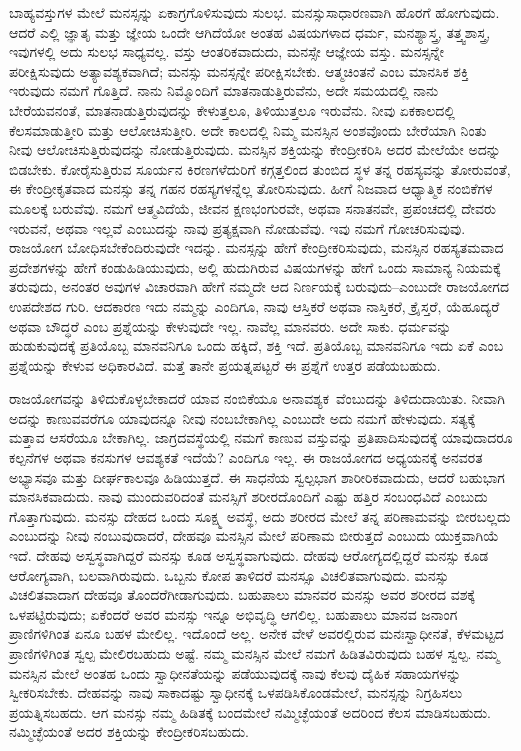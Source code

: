 \vskip 5pt

ಬಾಹ್ಯವಸ್ತುಗಳ ಮೇಲೆ ಮನಸ್ಸನ್ನು ಏಕಾಗ್ರಗೊಳಿಸುವುದು ಸುಲಭ. ಮನಸ್ಸು\break ಸಾಧಾರಣವಾಗಿ ಹೊರಗೆ ಹೋಗುವುದು. ಆದರೆ ಎಲ್ಲಿ ಜ್ಞಾತೃ ಮತ್ತು ಜ್ಞೇಯ ಒಂದೇ ಆಗಿದೆಯೋ ಅಂತಹ ವಿಷಯಗಳಾದ ಧರ್ಮ, ಮನಶ್ಯಾಸ್ತ್ರ, ತತ್ತ್ವಶಾಸ್ತ್ರ, ಇವುಗಳಲ್ಲಿ ಅದು ಸುಲಭ ಸಾಧ್ಯವಲ್ಲ. ವಸ್ತು ಆಂತರಿಕವಾದುದು, ಮನಸ್ಸೇ ಆಜ್ಞೇಯ ವಸ್ತು. ಮನಸ್ಸನ್ನೇ ಪರೀಕ್ಷಿಸುವುದು ಅತ್ಯಾವಶ್ಯಕವಾಗಿದೆ; ಮನಸ್ಸು ಮನಸ್ಸನ್ನೇ ಪರೀಕ್ಷಿಸಬೇಕು. ಆತ್ಮಚಿಂತನೆ ಎಂಬ ಮಾನಸಿಕ ಶಕ್ತಿ ಇರುವುದು ನಮಗೆ ಗೊತ್ತಿದೆ. ನಾನು ನಿಮ್ಮೊಂದಿಗೆ ಮಾತನಾಡುತ್ತಿರುವೆನು, ಅದೇ ಸಮಯದಲ್ಲಿ ನಾನು ಬೇರೆಯವನಂತೆ, ಮಾತನಾಡುತ್ತಿರುವುದನ್ನು ಕೇಳುತ್ತಲೂ, ತಿಳಿಯುತ್ತಲೂ ಇರುವೆನು. ನೀವು ಏಕಕಾಲದಲ್ಲಿ ಕೆಲಸಮಾಡುತ್ತೀರಿ ಮತ್ತು ಆಲೋಚಿಸುತ್ತೀರಿ. ಅದೇ ಕಾಲದಲ್ಲಿ ನಿಮ್ಮ ಮನಸ್ಸಿನ ಅಂಶವೊಂದು ಬೇರೆಯಾಗಿ ನಿಂತು ನೀವು ಆಲೋಚಿಸುತ್ತಿರುವುದನ್ನು ನೋಡುತ್ತಿರುವುದು. ಮನಸ್ಸಿನ ಶಕ್ತಿಯನ್ನು ಕೇಂದ್ರೀಕರಿಸಿ ಅದರ ಮೇಲೆಯೇ ಅದನ್ನು ಬಿಡಬೇಕು. ಕೋರೈಸುತ್ತಿರುವ ಸೂರ್ಯನ ಕಿರಣಗಳೆದುರಿಗೆ ಕಗ್ಗತ್ತಲಿಂದ ತುಂಬಿದ ಸ್ಥಳ ತನ್ನ ರಹಸ್ಯವನ್ನು ತೋರುವಂತೆ, ಈ ಕೇಂದ್ರೀಕೃತವಾದ ಮನಸ್ಸು ತನ್ನ ಗಹನ ರಹಸ್ಯಗಳನ್ನೆಲ್ಲ ತೋರಿಸುವುದು. ಹೀಗೆ ನಿಜವಾದ ಆಧ್ಯಾತ್ಮಿಕ ನಂಬಿಕೆಗಳ ಮೂಲಕ್ಕೆ ಬರುವೆವು. ನಮಗೆ ಆತ್ಮವಿದೆಯೆ, ಜೀವನ ಕ್ಷಣಭಂಗುರವೇ, ಅಥವಾ ಸನಾತನವೇ, ಪ್ರಪಂಚದಲ್ಲಿ ದೇವರು ಇರುವನೆ, ಅಥವಾ ಇಲ್ಲವೆ ಎಂಬುದನ್ನು ನಾವು ಪ್ರತ್ಯಕ್ಷವಾಗಿ ನೋಡುವೆವು. ಇವು ನಮಗೆ ಗೋಚರಿಸುವುವು. ರಾಜಯೋಗ ಬೋಧಿಸಬೇಕೆಂದಿರುವುದೇ ಇದನ್ನು. ಮನಸ್ಸನ್ನು ಹೇಗೆ ಕೇಂದ್ರೀಕರಿಸುವುದು, ಮನಸ್ಸಿನ ರಹಸ್ಯತಮವಾದ ಪ್ರದೇಶಗಳನ್ನು ಹೇಗೆ ಕಂಡುಹಿಡಿಯುವುದು, ಅಲ್ಲಿ ಹುದುಗಿರುವ ವಿಷಯಗಳನ್ನು ಹೇಗೆ ಒಂದು ಸಾಮಾನ್ಯ ನಿಯಮಕ್ಕೆ ತರುವುದು, ಅನಂತರ ಅವುಗಳ ವಿಚಾರವಾಗಿ ಹೇಗೆ ನಮ್ಮದೇ ಆದ ನಿರ್ಣಯಕ್ಕೆ ಬರುವುದು–ಎಂಬುದೇ ರಾಜಯೋಗದ ಉಪದೇಶದ ಗುರಿ. ಆದಕಾರಣ ಇದು ನಮ್ಮನ್ನು ಎಂದಿಗೂ, ನಾವು ಆಸ್ತಿಕರೆ ಅಥವಾ ನಾಸ್ತಿಕರೆ, ಕ್ರೈಸ್ತರೆ, ಯೆಹೂದ್ಯರೆ ಅಥವಾ ಬೌದ್ಧರೆ ಎಂಬ ಪ್ರಶ್ನೆಯನ್ನು ಕೇಳುವುದೇ ಇಲ್ಲ. ನಾವೆಲ್ಲ ಮಾನವರು. ಅದೇ ಸಾಕು. ಧರ್ಮವನ್ನು ಹುಡುಕುವುದಕ್ಕೆ ಪ್ರತಿಯೊಬ್ಬ ಮಾನವನಿಗೂ ಒಂದು ಹಕ್ಕಿದೆ, ಶಕ್ತಿ ಇದೆ. ಪ್ರತಿಯೊಬ್ಬ ಮಾನವನಿಗೂ ಇದು ಏಕೆ ಎಂಬ ಪ್ರಶ್ನೆಯನ್ನು ಕೇಳುವ ಅಧಿಕಾರವಿದೆ. ಮತ್ತೆ ತಾನೇ ಪ್ರಯತ್ನಪಟ್ಟರೆ ಈ ಪ್ರಶ್ನೆಗೆ ಉತ್ತರ ಪಡೆಯಬಹುದು. 

\vskip 5pt

ರಾಜಯೋಗವನ್ನು ತಿಳಿದುಕೊಳ್ಳಬೇಕಾದರೆ ಯಾವ ನಂಬಿಕೆಯೂ ಅನಾವಶ್ಯಕ\break\ ವೆಂಬುದನ್ನು ತಿಳಿದುದಾಯಿತು. ನೀವಾಗಿ ಅದನ್ನು ಕಾಣುವವರೆಗೂ ಯಾವುದನ್ನೂ ನೀವು ನಂಬಬೇಕಾಗಿಲ್ಲ ಎಂಬುದೇ ಅದು ನಮಗೆ ಹೇಳುವುದು. ಸತ್ಯಕ್ಕೆ ಮತ್ತಾವ ಆಸರೆಯೂ ಬೇಕಾಗಿಲ್ಲ. ಜಾಗ್ರದವಸ್ಥೆಯಲ್ಲಿ ನಮಗೆ ಕಾಣುವ ವಸ್ತುವನ್ನು ಪ್ರತಿಪಾದಿಸುವುದಕ್ಕೆ ಯಾವುದಾದರೂ ಕಲ್ಪನೆಗಳ ಅಥವಾ ಕನಸುಗಳ ಆವಶ್ಯಕತೆ ಇದೆಯೆ? ಎಂದಿಗೂ ಇಲ್ಲ. ಈ ರಾಜಯೋಗದ ಅಧ್ಯಯನಕ್ಕೆ ಅನವರತ ಅಭ್ಯಾಸವೂ ಮತ್ತು ದೀರ್ಘಕಾಲವೂ ಹಿಡಿಯುತ್ತದೆ. ಈ ಸಾಧನೆಯ ಸ್ವಲ್ಪಭಾಗ ಶಾರೀರಿಕವಾದುದು, ಆದರೆ ಬಹುಭಾಗ ಮಾನಸಿಕವಾದುದು. ನಾವು ಮುಂದುವರಿದಂತೆ ಮನಸ್ಸಿಗೆ ಶರೀರದೊಂದಿಗೆ ಎಷ್ಟು ಹತ್ತಿರ ಸಂಬಂಧವಿದೆ ಎಂಬುದು ಗೊತ್ತಾಗುವುದು. ಮನಸ್ಸು ದೇಹದ ಒಂದು ಸೂಕ್ಷ್ಮ ಅವಸ್ಥೆ, ಅದು ಶರೀರದ ಮೇಲೆ ತನ್ನ ಪರಿಣಾಮವನ್ನು ಬೀರಬಲ್ಲದು ಎಂಬುದನ್ನು ನೀವು ನಂಬುವುದಾದರೆ, ದೇಹವೂ ಮನಸ್ಸಿನ ಮೇಲೆ ಪರಿಣಾಮ ಬೀರುತ್ತದೆ ಎಂಬುದು ಯುಕ್ತವಾಗಿಯೆ ಇದೆ. ದೇಹವು ಅಸ್ವಸ್ಥವಾಗಿದ್ದರೆ ಮನಸ್ಸು ಕೂಡ ಅಸ್ವಸ್ಥವಾಗುವುದು. ದೇಹವು ಆರೋಗ್ಯದಲ್ಲಿದ್ದರೆ ಮನಸ್ಸು ಕೂಡ ಆರೋಗ್ಯವಾಗಿ, ಬಲವಾಗಿರುವುದು. ಒಬ್ಬನು ಕೋಪ ತಾಳಿದರೆ ಮನಸ್ಸೂ ವಿಚಲಿತವಾಗುವುದು. ಮನಸ್ಸು ವಿಚಲಿತವಾದಾಗ ದೇಹವೂ ತೊಂದರೆಗೀಡಾಗುವುದು. ಬಹುಪಾಲು ಮಾನವರ ಮನಸ್ಸು ಅವರ ಶರೀರದ ವಶಕ್ಕೆ ಒಳಪಟ್ಟಿರುವುದು; ಏಕೆಂದರೆ ಅವರ ಮನಸ್ಸು ಇನ್ನೂ ಅಭಿವೃದ್ಧಿ ಆಗಲಿಲ್ಲ. ಬಹುಪಾಲು ಮಾನವ ಜನಾಂಗ ಪ್ರಾಣಿಗಳಿಗಿಂತ ಏನೂ ಬಹಳ ಮೇಲಿಲ್ಲ. ಇದೊಂದೆ ಅಲ್ಲ. ಅನೇಕ ವೇಳೆ ಅವರಲ್ಲಿರುವ ಮನಃಸ್ವಾಧೀನತೆ, ಕೆಳಮಟ್ಟದ ಪ್ರಾಣಿಗಳಿಗಿಂತ ಸ್ವಲ್ಪ ಮೇಲಿರಬಹುದು ಅಷ್ಟೆ. ನಮ್ಮ ಮನಸ್ಸಿನ ಮೇಲೆ ನಮಗೆ ಹಿಡಿತವಿರುವುದು ಬಹಳ ಸ್ವಲ್ಪ. ನಮ್ಮ ಮನಸ್ಸಿನ ಮೇಲೆ ಅಂತಹ ಒಂದು ಸ್ವಾಧೀನತೆಯನ್ನು ಪಡೆಯುವುದಕ್ಕೆ ನಾವು ಕೆಲವು ದೈಹಿಕ ಸಹಾಯಗಳನ್ನು ಸ್ವೀಕರಿಸಬೇಕು. ದೇಹವನ್ನು ನಾವು ಸಾಕಾದಷ್ಟು ಸ್ವಾಧೀನಕ್ಕೆ ಒಳಪಡಿಸಿಕೊಂಡಮೇಲೆ, ಮನಸ್ಸನ್ನು ನಿಗ್ರಹಿಸಲು ಪ್ರಯತ್ನಿಸಬಹದು. ಆಗ ಮನಸ್ಸು ನಮ್ಮ ಹಿಡಿತಕ್ಕೆ ಬಂದಮೇಲೆ ನಮ್ಮಿಚ್ಛೆಯಂತೆ ಅದರಿಂದ ಕೆಲಸ ಮಾಡಿಸಬಹುದು. ನಮ್ಮಿಚ್ಛೆಯಂತೆ ಅದರ ಶಕ್ತಿಯನ್ನು ಕೇಂದ್ರೀಕರಿಸಬಹುದು. 

